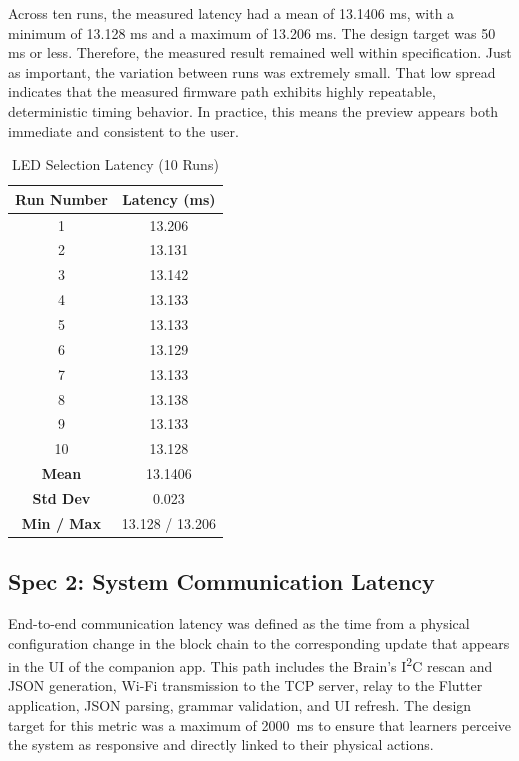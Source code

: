 \documentclass[10pt, conference]{IEEEtran}
\begin{document}
Across ten runs, the measured latency had a mean of 13.1406 ms, with a minimum of 13.128 ms and a maximum of 13.206 ms. The design target was 50 ms or less. Therefore, the measured result remained well within specification. Just as important, the variation between runs was extremely small. That low spread indicates that the measured firmware path exhibits highly repeatable, deterministic timing behavior. In practice, this means the preview appears both immediate and consistent to the user.

\begin{table}[htbp]
\renewcommand{\arraystretch}{1.3}
\caption{LED Selection Latency (10 Runs)}
\label{tab:LED_latency}
\centering
\begin{tabular}{c c}
\toprule
\textbf{Run Number} & \textbf{Latency (ms)} \\
\midrule
1 & 13.206 \\
2 & 13.131 \\
3 & 13.142 \\
4 & 13.133 \\
5 & 13.133 \\
6 & 13.129 \\
7 & 13.133 \\
8 & 13.138 \\
9 & 13.133 \\
10 & 13.128 \\
\midrule
\textbf{Mean} & 13.1406 \\
\textbf{Std Dev} & 0.023 \\
\textbf{Min / Max} & 13.128 / 13.206 \\
\bottomrule
\end{tabular}
\end{table}

\subsection{Spec 2: System Communication Latency}
End-to-end communication latency was defined as the time from a physical configuration change in the block chain to the corresponding update that appears in the UI of the companion app. This path includes the Brain's I\textsuperscript{2}C rescan and JSON generation, Wi-Fi transmission to the TCP server, relay to the Flutter application, JSON parsing, grammar validation, and UI refresh. The design target for this metric was a maximum of 2000~ms to ensure that learners perceive the system as responsive and directly linked to their physical actions.
\end{document}
